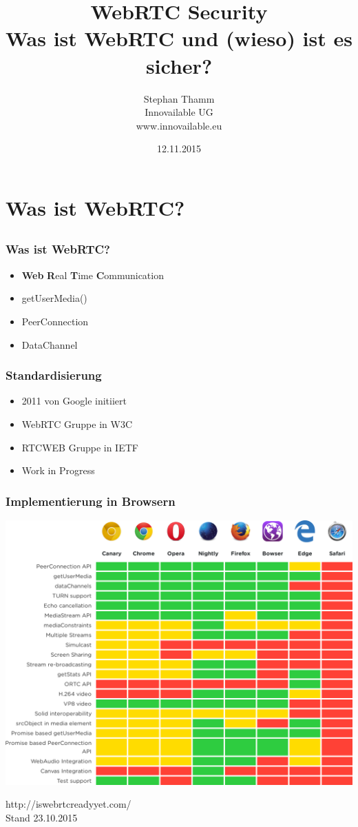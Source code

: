 \documentclass[12pt]{beamer}
\title{\huge WebRTC Security \\ \small Was ist WebRTC und (wieso) ist es sicher?}
\author{Stephan Thamm \\ Innovailable UG \\ www.innovailable.eu}
\date{12.11.2015}
\begin{document}
\maketitle

\frame{\tableofcontents[sections={1-4}]}


\section{Was ist WebRTC?}
\subsection{} 

\begin{frame}
  \frametitle{Was ist WebRTC?}
  \begin{itemize}
    \item<2-> \textbf{Web} \textbf{R}eal \textbf{T}ime \textbf{C}ommunication
    \item<3-> getUserMedia()
    \item<4-> PeerConnection
    \item<5-> DataChannel
  \end{itemize}
\end{frame}

\begin{frame}
  \frametitle{Standardisierung}
  \begin{itemize}
    \item<2-> 2011 von Google initiiert
    \item<3-> WebRTC Gruppe in W3C
    \item<4-> RTCWEB Gruppe in IETF
    \item<5-> Work in Progress
  \end{itemize}
\end{frame}

\begin{frame}
  \frametitle{Implementierung in Browsern}
  \pause
  \centerline{\includegraphics[height=0.7\textheight]{img/webrtc_ready.png}}
  \hfill \tiny http://iswebrtcreadyyet.com/ \\
  \hfill \tiny Stand 23.10.2015
\end{frame}
\end{document}
